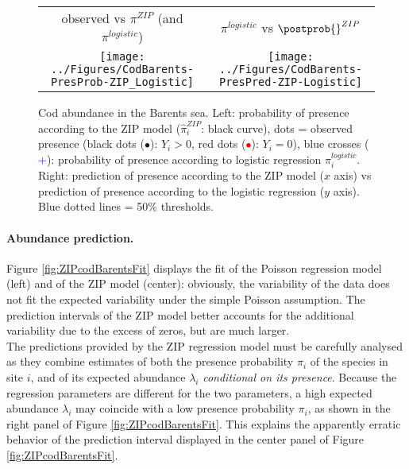 \begin{figure}[ht]
  \begin{center}
    \begin{tabular}{cc}
      observed vs $\pi^{ZIP}$ (and $\pi^{logistic}$) &
      $\pi^{logistic}$ vs $\postprob{}^{ZIP}$ \\
      \texttt{[image: ../Figures/CodBarents-PresProb-ZIP\_Logistic]} &
      \texttt{[image: ../Figures/CodBarents-PresPred-ZIP-Logistic]} 
    \end{tabular}
    \caption{Cod abundance in the Barents sea. %
    Left: probability of presence according to the ZIP model ($\widehat{\pi}_i^{ZIP}$: black curve), 
    dots = observed presence (black dots ($\bullet$): $Y_i > 0$, red dots (\textcolor{red}{$\bullet$}): $Y_i = 0$), 
    blue crosses (\textcolor{blue}{$+$}): probability of presence according to logistic regression $\pi_i^{logistic}$. \\
    Right: prediction of presence according to the ZIP model ($x$ axis) vs prediction of presence according to the logistic regression ($y$ axis). Blue dotted lines = 50\% thresholds.
    \label{fig:ZIPcodBarentsFit-presence}}  
    \end{center}
\end{figure}

\paragraph{Abundance prediction.}
Figure \ref{fig:ZIPcodBarentsFit} displays the fit of the Poisson regression model (left) and of the ZIP model (center): obviously, the variability of the data does not fit the expected variability under the simple Poisson assumption. The prediction intervals of the ZIP model better accounts for the additional variability due to the excess of zeros, but are much larger. \\
The predictions provided by the ZIP regression model must be carefully analysed as they combine estimates of both the presence probability $\pi_i$ of the species in site $i$, and of its expected abundance $\lambda_i$ {\sl conditional on its presence}. Because the regression parameters are different for the two parameters, a high expected abundance $\lambda_i$ may coincide with a low presence probability $\pi_i$, as shown in the right panel of Figure \ref{fig:ZIPcodBarentsFit}. This explains the apparently erratic behavior of the prediction interval displayed in the center panel of Figure \ref{fig:ZIPcodBarentsFit}. 

